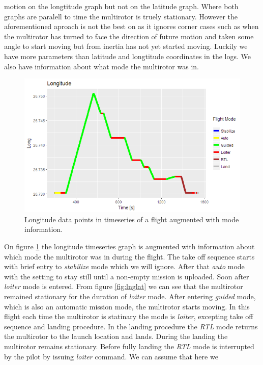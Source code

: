 \documentclass[12pt,oneside]{reedthesis}
\theoremstyle{definition}
\theoremstyle{definition}
\theoremstyle{definition}
\theoremstyle{remark}
\begin{document}
motion on the longtitude graph but not on the latitude graph. Where both
graphs are paralell to time the multirotor is truely stationary. However
the aforementioned aproach is not the best on as it ignores corner cases
such as when the multirotor has turned to face the direction of future
motion and taken some angle to start moving but from inertia has not yet
started moving. Luckily we have more parameters than latitude and
longtitude coordinates in the logs. We also have information about what
mode the multirotor was in.
\begin{figure}
\centering
\includegraphics{./figure/longWithMode.PNG}
\caption{\label{fig:lngmode}Longitude data points in timeseries of a flight
augmented with mode information.}
\end{figure}
On figure \ref{fig:lngmode} the longitude timeseries graph is augmented
with information about which mode the multirotor was in during the
flight. The take off sequence starts with brief entry to
\emph{stabilize} mode which we will ignore. After that \emph{auto} mode
with the setting to stay still until a non-empty mission is uploaded.
Soon after \emph{loiter} mode is entered. From figure \ref{fig:lnglat}
we can see that the multirotor remained stationary for the duration of
\emph{loiter} mode. After entering \emph{guided} mode, which is also an
automatic mission mode, the multirotor starts moving. In this flight
each time the multirotor is statinary the mode is \emph{loiter},
excepting take off sequence and landing procedure. In the landing
procedure the \emph{RTL} mode returns the multirotor to the launch
location and lands. During the landing the multirotor remains
stationary. Before fully landing the \emph{RTL} mode is interrupted by
the pilot by issuing \emph{loiter} command. We can assume that here we
\end{document}
